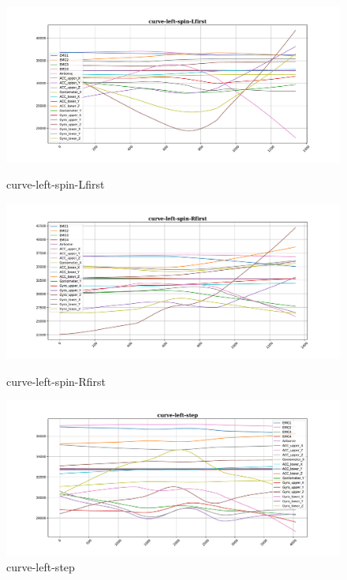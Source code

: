 \begin{figure}[!tbp]
	\begin{minipage}[b]{0.31\textwidth}
		\includegraphics[width=\textwidth]{images/curve-left-spin-Lfirst_example.pdf}
		\caption{curve-left-spin-Lfirst}
		\label{sm1}
	\end{minipage}
	\begin{minipage}[b]{0.31\textwidth}
		\includegraphics[width=\textwidth]{images/curve-left-spin-Rfirst_example.pdf}
		\caption{curve-left-spin-Rfirst}
	\end{minipage}
	\begin{minipage}[b]{0.31\textwidth}
		\includegraphics[width=\textwidth]{images/curve-left-step_example.pdf}
		\caption{curve-left-step}
	\end{minipage}
\end{figure}

